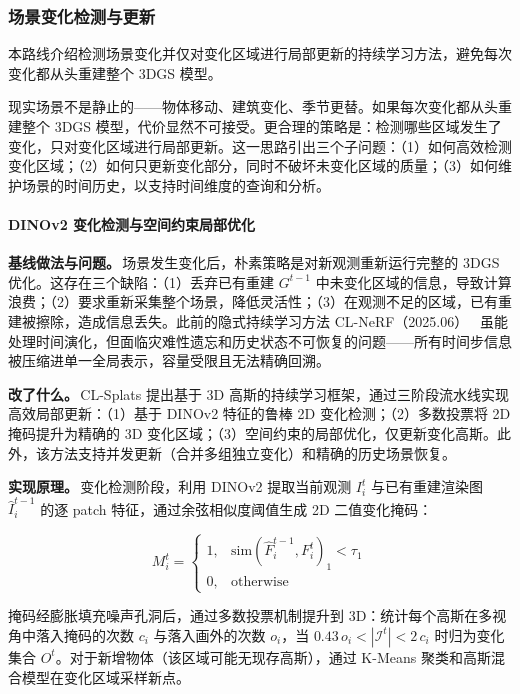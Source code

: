 \subsubsection{场景变化检测与更新}

本路线介绍检测场景变化并仅对变化区域进行局部更新的持续学习方法，避免每次变化都从头重建整个 3DGS 模型。

现实场景不是静止的——物体移动、建筑变化、季节更替。如果每次变化都从头重建整个 3DGS 模型，代价显然不可接受。更合理的策略是：检测哪些区域发生了变化，只对变化区域进行局部更新。这一思路引出三个子问题：（1）如何高效检测变化区域；（2）如何只更新变化部分，同时不破坏未变化区域的质量；（3）如何维护场景的时间历史，以支持时间维度的查询和分析。

\paragraph{DINOv2 变化检测与空间约束局部优化}

\textbf{基线做法与问题。}\,场景发生变化后，朴素策略是对新观测重新运行完整的 3DGS 优化。这存在三个缺陷：（1）丢弃已有重建 $G^{t-1}$ 中未变化区域的信息，导致计算浪费；（2）要求重新采集整个场景，降低灵活性；（3）在观测不足的区域，已有重建被擦除，造成信息丢失。此前的隐式持续学习方法 CL-NeRF（2025.06）~\cite{2506_21117} 虽能处理时间演化，但面临灾难性遗忘和历史状态不可恢复的问题——所有时间步信息被压缩进单一全局表示，容量受限且无法精确回溯。

\textbf{改了什么。}\,CL-Splats 提出基于 3D 高斯的持续学习框架，通过三阶段流水线实现高效局部更新：（1）基于 DINOv2 特征的鲁棒 2D 变化检测；（2）多数投票将 2D 掩码提升为精确的 3D 变化区域；（3）空间约束的局部优化，仅更新变化高斯。此外，该方法支持并发更新（合并多组独立变化）和精确的历史场景恢复。

\textbf{实现原理。}\,变化检测阶段，利用 DINOv2 提取当前观测 $I_i^t$ 与已有重建渲染图 $\hat{I}_i^{t-1}$ 的逐 patch 特征，通过余弦相似度阈值生成 2D 二值变化掩码：

\begin{equation}
    M_i^t = \begin{cases}
        1, & \text{sim}(\hat{F}_i^{t-1}, F_i^t)_1 < \tau_1 \\
        0, & \text{otherwise}
    \end{cases}
\end{equation}

掩码经膨胀填充噪声孔洞后，通过多数投票机制提升到 3D：统计每个高斯在多视角中落入掩码的次数 $c_i$ 与落入画外的次数 $o_i$，当 $0.43\, o_i < |\mathcal{I}^t| < 2\, c_i$ 时归为变化集合 $O^t$。对于新增物体（该区域可能无现存高斯），通过 K-Means 聚类和高斯混合模型在变化区域采样新点。

